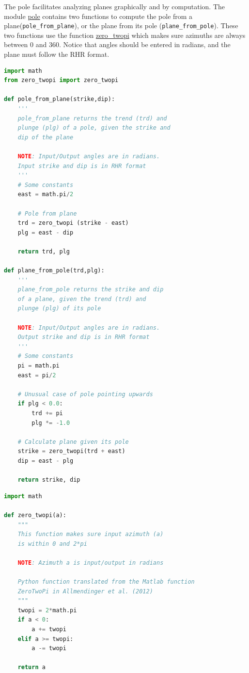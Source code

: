 \documentclass[a4paper , 12pt]{book}
\newcommand{\code}[1]{\colorbox{light-gray}{\texttt{#1}}}
\begin{document}
The pole facilitates analyzing planes graphically and by computation. The module  \href{https://github.com/nfcd/compGeo/blob/master/source/functions/pole.py}{pole} contains two functions to compute the pole from a plane\newline (\code{pole\_from\_plane}), or the plane from its pole (\code{plane\_from\_pole}). These two functions use the function \href{https://github.com/nfcd/compGeo/blob/master/source/functions/zero_twopi.py}{zero\_twopi} which makes sure azimuths are always between 0 and 360\degree. Notice that angles should be entered in radians, and the plane must follow the RHR format.

\begin{center}
\begin{lstlisting}[language=Python, frame=single]
import math
from zero_twopi import zero_twopi

def pole_from_plane(strike,dip):
	'''
	pole_from_plane returns the trend (trd) and 
	plunge (plg) of a pole, given the strike and 
	dip of the plane
	
	NOTE: Input/Output angles are in radians.
	Input strike and dip is in RHR format
	'''
	# Some constants
	east = math.pi/2
	
	# Pole from plane
	trd = zero_twopi (strike - east)
	plg = east - dip
	
	return trd, plg

def plane_from_pole(trd,plg):
	'''
	plane_from_pole returns the strike and dip
	of a plane, given the trend (trd) and 
	plunge (plg) of its pole
	
	NOTE: Input/Output angles are in radians.
	Output strike and dip is in RHR format
	'''
	# Some constants
	pi = math.pi
	east = pi/2
	
	# Unusual case of pole pointing upwards
	if plg < 0.0:
		trd += pi
		plg *= -1.0
		
	# Calculate plane given its pole
	strike = zero_twopi(trd + east)
	dip = east - plg
		
	return strike, dip
\end{lstlisting}
\end{center}

\begin{center}
\begin{lstlisting}[language=Python, frame=single]
import math

def zero_twopi(a):
	"""
	This function makes sure input azimuth (a)
	is within 0 and 2*pi
	
	NOTE: Azimuth a is input/output in radians
	
	Python function translated from the Matlab function
	ZeroTwoPi in Allmendinger et al. (2012)
	"""
	twopi = 2*math.pi
	if a < 0:
		a += twopi
	elif a >= twopi:
		a -= twopi
	
	return a
\end{lstlisting}    
\end{center}
\end{document}
